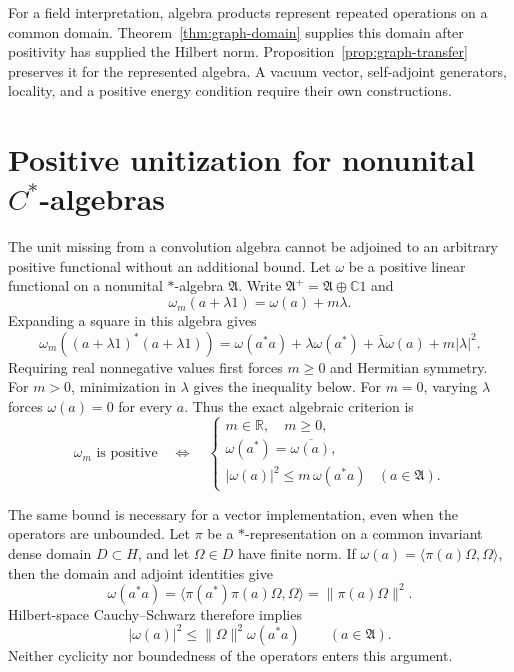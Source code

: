 \documentclass[11pt]{article}
\theoremstyle{definition}
\theoremstyle{remark}
\numberwithin{equation}{section}
\newcommand{\R}{\mathbb R}
\newcommand{\C}{\mathbb C}
\begin{document}
For a field interpretation, algebra products represent repeated operations
on a common domain.  Theorem~\ref{thm:graph-domain} supplies this domain
after positivity has supplied the Hilbert norm.
Proposition~\ref{prop:graph-transfer} preserves it for the represented
algebra.  A vacuum vector, self-adjoint generators, locality, and a positive
energy condition require their own constructions.

\section{Positive unitization for nonunital
\texorpdfstring{$C^*$}{C-star}-algebras}

The unit missing from a convolution algebra cannot be adjoined to an
arbitrary positive functional without an additional bound.  Let $\omega$
be a positive linear functional on a nonunital $*$-algebra $\mathfrak A$.
Write
$\mathfrak A^+=\mathfrak A\oplus\C1$ and
\begin{equation}
 \omega_m(a+\lambda1)=\omega(a)+m\lambda.
 \label{eq:unit-extension}
\end{equation}
Expanding a square in this algebra gives
\[
 \omega_m((a+\lambda1)^*(a+\lambda1))
 =\omega(a^*a)+\lambda\omega(a^*)+\bar\lambda\omega(a)+m|\lambda|^2.
\]
Requiring real nonnegative values first forces $m\geq0$ and Hermitian
symmetry.  For $m>0$, minimization in $\lambda$ gives the inequality below.
For $m=0$, varying $\lambda$ forces $\omega(a)=0$ for every $a$.
Thus the exact algebraic criterion is
\begin{equation}
 \omega_m\text{ is positive}
 \quad\Longleftrightarrow\quad
 \begin{cases}
 m\in\R,\quad m\geq0,\\
 \omega(a^*)=\overline{\omega(a)},\\
 |\omega(a)|^2\leq m\,\omega(a^*a)&(a\in\mathfrak A).
 \end{cases}
 \label{eq:unit-criterion}
\end{equation}

The same bound is necessary for a vector implementation, even when the
operators are unbounded.  Let $\pi$ be a $*$-representation on a common
invariant dense domain $D\subset H$, and let $\Omega\in D$ have finite norm.
If $\omega(a)=\langle\pi(a)\Omega,\Omega\rangle$, then the domain and
adjoint identities give
\[
 \omega(a^*a)=\langle\pi(a^*)\pi(a)\Omega,\Omega\rangle
             =\|\pi(a)\Omega\|^2.
\]
Hilbert-space Cauchy--Schwarz therefore implies
\begin{equation}
 |\omega(a)|^2\leq\|\Omega\|^2\omega(a^*a)
 \qquad(a\in\mathfrak A).
 \label{eq:vector-unit-bound}
\end{equation}
Neither cyclicity nor boundedness of the operators enters this argument.
\end{document}
